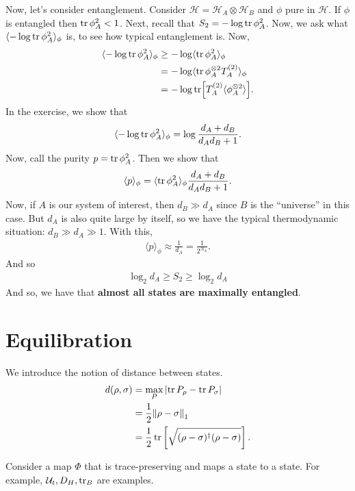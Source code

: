 \documentclass{book}
\theoremstyle{definition}
\newcommand{\nn}{\nonumber}
\newcommand{\had}{\mathcal{H}}
\newcommand{\f}[2]{\frac{#1}{#2}}
\newcommand{\lb}{\left[}
\newcommand{\rb}{\right]}
\newcommand{\la}{\langle}
\newcommand{\ra}{\rangle}
\newcommand{\U}{\mathcal{U}}
\begin{document}
Now, let's consider entanglement. Consider $\had = \had_A \otimes \had_B$ and $\phi$ pure in $\had$. If $\phi$ is entangled then $\tr \phi_A^2 < 1$. Next, recall that $S_2 =  -\log \tr \phi_A^2 $. Now, we ask what $\la -\log \tr \phi_A^2 \ra_\phi$ is, to see how typical entanglement is. Now, 
\begin{align}
\la -\log \tr \phi_A^2 \ra_\phi &\geq -\log \la \tr \phi_A^2 \ra_\phi \nn\\
 &= -\log \la \tr \phi_A^{\otimes 2}  T^{(2)}_A\ra_\phi \nn\\
 &= -\log \tr[T_A^{(2)} \la \phi_A^{\otimes 2} \ra].
\end{align}
In the exercise, we show that 
\begin{align}
\la -\log \tr \phi_A^2 \ra_\phi = \log \f{d_A + d_B}{d_Ad_B+1}.
\end{align}
Now, call the purity $p = \tr \phi_A^2$. Then we show that
\begin{align}
\la p \ra_\phi = \la \tr \phi_A^2 \ra_\phi \f{d_A + d_B}{d_Ad_B+1}.
\end{align} 
Now, if $A$ is our system of interest, then $d_B \gg d_A$ since $B$ is the ``universe'' in this case. But $d_A$ is also quite large by itself, so we have the typical thermodynamic situation: $d_B \gg d_A \gg 1$. With this, 
\begin{align}
\la p \ra_\phi  \approx \f{1}{d_A} = \f{1}{2^{N_A}}.
\end{align}
And so
\begin{align}
\log_2 d_A \geq S_2 \geq \log_2 d_A
\end{align} 
And so, we have that \textbf{almost all states are maximally entangled}.

\newpage

\section{Equilibration}

We introduce the notion of distance between states. 
\begin{align}
d(\rho,\sigma) &= \max_P \abs{\tr P_\rho - \tr P_\sigma} \nn\\
&= \f{1}{2}\norm{\rho - \sigma}_1 \nn\\
&= \f{1}{2}\tr \lb \sqrt{(\rho-\sigma)^\dagger(\rho-\sigma)} \rb.
\end{align}

Consider a map $\Phi$ that is  trace-preserving and maps a state to a state. For example, $\U_t, D_H, \tr_B$ are examples. 
\end{document}
